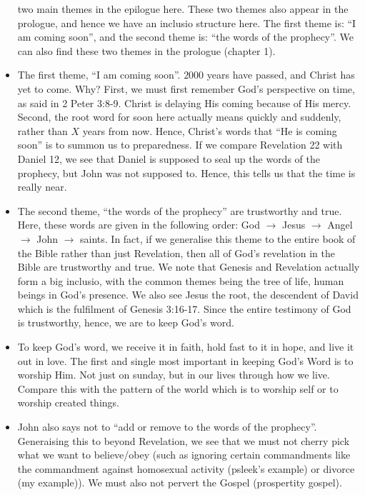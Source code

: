 \begin{itemize}
{  two main themes in the epilogue here. These two themes also appear in the
  prologue, and hence we have an inclusio structure here. The first theme is:
  ``I am coming soon'', and the second theme is: ``the words of the
  prophecy''. We can also find these two themes in the prologue (chapter 1).}
  \item{The first theme, ``I am coming soon''. $2000$ years have passed, and
  Christ has yet to come. Why? First, we must first remember God's
  perspective on time, as said in 2 Peter 3:8-9. Christ is delaying His
  coming because of His mercy. Second, the root word for soon here actually
  means quickly and suddenly, rather than $X$ years from now. Hence, Christ's
  words that ``He is coming soon'' is to summon us to preparedness. If we
  compare Revelation 22 with Daniel 12, we see that Daniel is supposed to
  seal up the words of the prophecy, but John was not supposed to. Hence,
  this tells us that the time is really near. }
  \item{The second theme, ``the words of the prophecy'' are trustworthy and
  true. Here, these words are given in the following order: God $\rightarrow$
  Jesus $\rightarrow$ Angel $\rightarrow$ John $\rightarrow$ saints. In fact,
  if we generalise this theme to the entire book of the Bible rather than
  just Revelation, then all of God's revelation in the Bible are trustworthy
  and true. We note that Genesis and Revelation actually form a big inclusio,
  with the common themes being the tree of life, human beings in God's
  presence. We also see Jesus the root, the descendent of David which is the fulfilment of Genesis 3:16-17. Since the entire testimony of God is trustworthy, hence, we are to keep God's word.}
  \item{To keep God's word, we receive it in faith, hold fast to it in hope,
  and live it out in love. The first and single most important in keeping
  God's Word is to worship Him. Not just on sunday, but in our lives through
  how we live. Compare this with the pattern of the world which is to worship
  self or to worship created things.}
  \item{John also says not to ``add or remove to the words of the prophecy''.
  Generaising this to beyond Revelation, we see that we must not cherry pick
  what we want to believe/obey (such as ignoring certain commandments like
  the commandment against homosexual activity (psleek's example) or divorce
  (my example)). We must also not pervert the Gospel
  (prospertity gospel). }
\end{itemize}
